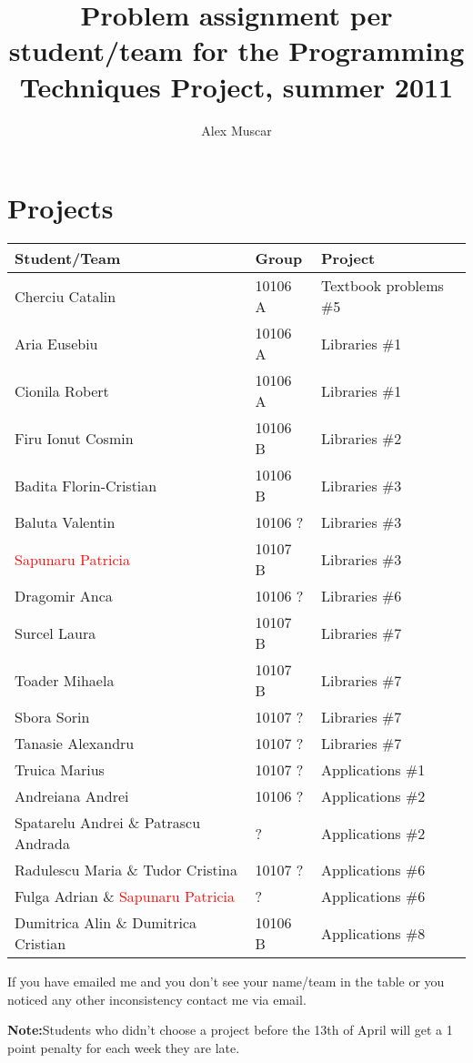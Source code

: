 \documentclass{article}
\begin{document}
\title{Problem assignment per student/team for the Programming Techniques Project, summer 2011}
\author{Alex Muscar}
\maketitle

\section{Projects}

\centering
\begin{tabular}{ | l | l | l | }
  \hline
  \textbf{Student/Team} & \textbf{Group} & \textbf{Project} \\ \hline
  Cherciu Catalin & 10106 A &Textbook problems \#5 \\ \hline
  Aria Eusebiu & 10106 A & Libraries \#1 \\ \hline
  Cionila Robert & 10106 A & Libraries \#1 \\ \hline
  Firu Ionut Cosmin & 10106 B & Libraries \#2 \\ \hline
  Badita Florin-Cristian & 10106 B & Libraries \#3 \\ \hline
  Baluta Valentin & 10106 ? & Libraries \#3 \\ \hline
  \textcolor{red}{Sapunaru Patricia} & 10107 B & Libraries \#3 \\ \hline
  Dragomir Anca & 10106 ? & Libraries \#6 \\ \hline
  Surcel Laura & 10107 B & Libraries \#7 \\ \hline
  Toader Mihaela & 10107 B & Libraries \#7 \\ \hline
  Sbora Sorin & 10107 ? & Libraries \#7 \\ \hline
  Tanasie Alexandru & 10107 ? & Libraries \#7 \\ \hline
  Truica Marius & 10107 ? & Applications \#1 \\ \hline
  Andreiana Andrei & 10106 ? & Applications \#2 \\ \hline
  Spatarelu Andrei \& Patrascu Andrada & ? & Applications \#2 \\ \hline
  Radulescu Maria \& Tudor Cristina & 10107 ? & Applications \#6 \\ \hline
  Fulga Adrian \& \textcolor{red}{Sapunaru Patricia} & ? & Applications \#6 \\ \hline
  Dumitrica Alin \& Dumitrica Cristian & 10106 B & Applications \#8 \\
  \hline
\end{tabular}

If you have emailed me and you don't see your name/team in the table or you noticed any other inconsistency contact me via email.

\textbf{Note:}Students who didn't choose a project before the 13th of April will get a 1 point penalty for each week they are late.
\end{document}
